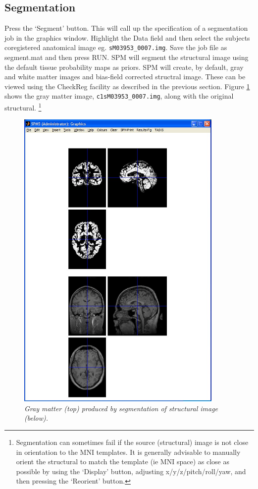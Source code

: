 \subsection{Segmentation}

Press the `Segment' button. This will call up the specification of a segmentation job in the graphics 
window. Highlight the Data field and then select 
the subjects coregistered anatomical image 
eg. \verb!sM03953_0007.img!. Save the job file
as {\sf segment.mat} and then press RUN.
SPM will segment the structural image using 
the default tissue probability maps as 
priors. 
SPM will create, by default, gray and white matter
images and bias-field corrected structral image.
These can be viewed using the CheckReg facility 
as described in the previous section. Figure \ref{face_gray} shows the gray matter image, \verb!c1sM03953_0007.img!, along with the original structural. \footnote{Segmentation can sometimes fail if the source (structural) image is not close in orientation to the MNI templates. It is generally advisable to manually orient the structural to match the template (ie MNI space) as close as possible by using the `Display' button, adjusting x/y/z/pitch/roll/yaw, and then pressing the `Reorient' button.}

\begin{figure}
\begin{center}
\includegraphics[width=100mm]{faces/gray}
\caption{\em Gray matter (top) produced by segmentation of structural image (below). \label{face_gray}}
\end{center}
\end{figure}

